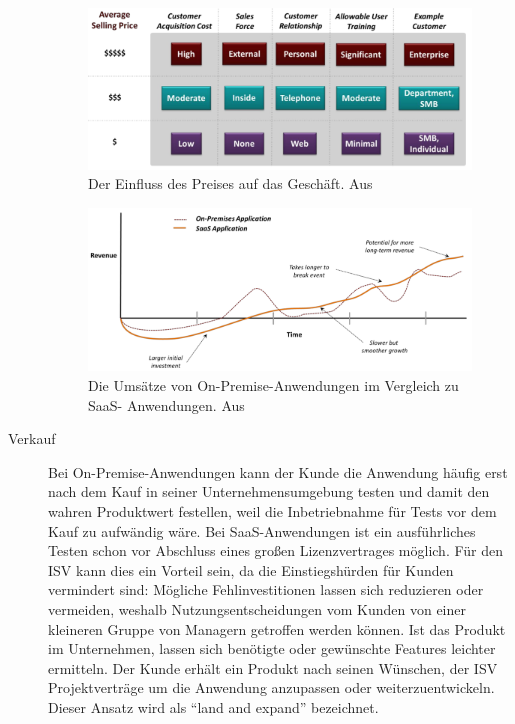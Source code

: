\begin{description}
\begin{figure}%
\begin{center}
\includegraphics[width=\textwidth]{images/einfluss_des_preises_auf_business.png}
\caption{Der Einfluss des Preises auf das Geschäft. Aus
\protect{} }
\label{fig:einfluss_des_preises_auf_business}
\end{center}
\end{figure}

\begin{figure}%
\begin{center}
\includegraphics[width=\textwidth]{images/vergleich_umsatz_on-premise_cloud.png}
\caption{Die Umsätze von On-Premise-Anwendungen im Vergleich zu SaaS-
Anwendungen. Aus
\protect{} }
\label{fig:vergleich_umsatz_on-premise_cloud}
\end{center}
\end{figure}

	\item[Verkauf] Bei On-Premise-Anwendungen kann der Kunde die Anwendung
häufig erst nach dem Kauf in seiner Unternehmensumgebung testen und damit den
wahren Produktwert festellen, weil die Inbetriebnahme für Tests vor dem Kauf zu
aufwändig wäre. Bei SaaS-Anwendungen ist ein ausführliches Testen schon vor
Abschluss eines großen Lizenzvertrages möglich. Für den ISV kann dies ein
Vorteil sein, da die Einstiegshürden für Kunden vermindert sind: Mögliche
Fehlinvestitionen lassen sich reduzieren oder vermeiden, weshalb
Nutzungsentscheidungen vom Kunden von einer kleineren Gruppe von Managern
getroffen werden können. Ist das Produkt im Unternehmen, lassen sich benötigte
oder gewünschte Features leichter ermitteln. Der Kunde erhält ein Produkt nach
seinen Wünschen, der ISV Projektverträge um die Anwendung anzupassen oder
weiterzuentwickeln. Dieser Ansatz wird als "`land and expand"' bezeichnet.

\end{description}


